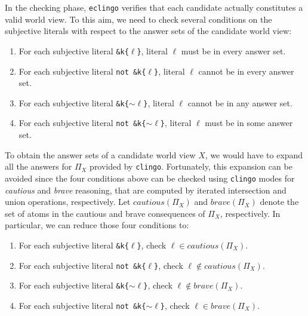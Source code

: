 \documentclass{new_tlp}
\newcommand{\sidecomment}[1]{\marginpar{\footnotesize \emph{\color{blue} #1}}}
\def\eclingo{{\tt eclingo}}
\def\clingo{{\tt clingo}}
\begin{document}

In the checking phase, \eclingo{} verifies that each candidate actually constitutes a valid world view.
%
To this aim, we need to check several conditions on the subjective literals with respect to the answer sets of the candidate world view:
%
\begin{enumerate}
    \item For each subjective literal \texttt{\&k\{$\ell$\}}, literal $\ell$ must be in every answer set.

    \item For each subjective literal \texttt{not \&k\{$\ell$\}}, literal $\ell$ cannot be in every answer set.

    \item For each subjective literal \texttt{\&k\{$\sim \ell$\}}, literal $\ell$ cannot be in any answer set.

    \item For each subjective literal \texttt{not \&k\{$\sim \ell$\}}, literal $\ell$ must be in some answer set.
\end{enumerate}
To obtain the answer sets of a candidate world view $X$, we would have to expand all the answers for $\Pi_X$ provided by \clingo{}. 
%
Fortunately, this expansion can be avoided since the four conditions above can be checked using \clingo{} modes for \emph{cautious} and \emph{brave} reasoning, that are computed by iterated intersection and union operations, respectively.
%
Let $\mathit{cautious}(\Pi_X)$ and $\mathit{brave}(\Pi_X)$ denote the set of atoms in the cautious and brave consequences of $\Pi_X$, respectively.
In particular, we can reduce those four conditions to:
\begin{enumerate}
    \item For each subjective literal \texttt{\&k\{$\ell$\}}, check $\ell \in \mathit{cautious}(\Pi_X)$.

    \item For each subjective literal \texttt{not \&k\{$\ell$\}}, check $\ell \not\in \mathit{cautious}(\Pi_X)$.

    \item For each subjective literal \texttt{\&k\{$\sim \ell$\}}, check $\ell \not\in \mathit{brave}(\Pi_X)$.

    \item For each subjective literal \texttt{not \&k\{$\sim \ell$\}}, check $\ell \in \mathit{brave}(\Pi_X)$.
\end{enumerate}
\end{document}

